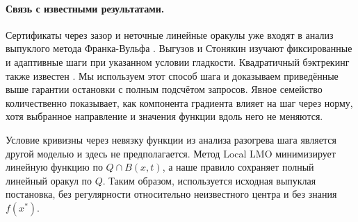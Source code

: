 \paragraph{Связь с известными результатами.}
Сертификаты через зазор и неточные линейные оракулы уже входят в
анализ выпуклого метода Франка-Вульфа \cite{jaggi}.
Выгузов и Стонякин \cite{vyguzov} изучают фиксированные и адаптивные
шаги при указанном условии гладкости.
Квадратичный бэктрекинг также известен \cite{pedregosa}.
Мы используем этот способ шага и доказываем приведённые выше гарантии
остановки с полным подсчётом запросов. Явное семейство количественно
показывает, как компонента градиента влияет на шаг через норму,
хотя выбранное направление и значения функции вдоль него не меняются.

Условие кривизны через невязку функции из анализа разогрева шага
\cite{warmup} является другой моделью и здесь не предполагается.
Метод Local LMO \cite{locallmo} минимизирует линейную функцию
по $Q\cap B(x,t)$, а наше правило сохраняет полный линейный оракул
по $Q$. Таким образом, используется исходная выпуклая постановка,
без регулярности относительно неизвестного центра и без знания
$f(x^*)$.
